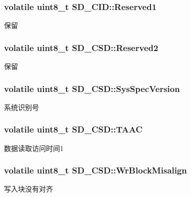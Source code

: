 \subsubsection[{\texorpdfstring{Reserved1}{Reserved1}}]{\setlength{\rightskip}{0pt plus 5cm}volatile uint8\+\_\+t S\+D\+\_\+\+C\+I\+D\+::\+Reserved1}\hypertarget{group__sd__card_ga1d5599017d56204e4fe5b0aa7dd32294}{}\label{group__sd__card_ga1d5599017d56204e4fe5b0aa7dd32294}
保留 
\subsubsection[{\texorpdfstring{Reserved2}{Reserved2}}]{\setlength{\rightskip}{0pt plus 5cm}volatile uint8\+\_\+t S\+D\+\_\+\+C\+S\+D\+::\+Reserved2}\hypertarget{group__sd__card_gae550128917d915a10d07cc6bab428d4a}{}\label{group__sd__card_gae550128917d915a10d07cc6bab428d4a}
保留 
\subsubsection[{\texorpdfstring{Sys\+Spec\+Version}{SysSpecVersion}}]{\setlength{\rightskip}{0pt plus 5cm}volatile uint8\+\_\+t S\+D\+\_\+\+C\+S\+D\+::\+Sys\+Spec\+Version}\hypertarget{group__sd__card_gae42076ec74babfee72c7a3705d13461a}{}\label{group__sd__card_gae42076ec74babfee72c7a3705d13461a}
系统识别号 
\subsubsection[{\texorpdfstring{T\+A\+AC}{TAAC}}]{\setlength{\rightskip}{0pt plus 5cm}volatile uint8\+\_\+t S\+D\+\_\+\+C\+S\+D\+::\+T\+A\+AC}\hypertarget{group__sd__card_gac3a3b789a57530a170119a3459571632}{}\label{group__sd__card_gac3a3b789a57530a170119a3459571632}
数据读取访问时间1 
\subsubsection[{\texorpdfstring{Wr\+Block\+Misalign}{WrBlockMisalign}}]{\setlength{\rightskip}{0pt plus 5cm}volatile uint8\+\_\+t S\+D\+\_\+\+C\+S\+D\+::\+Wr\+Block\+Misalign}\hypertarget{group__sd__card_gac92bbdc65323bdaa2738ba34fb801694}{}\label{group__sd__card_gac92bbdc65323bdaa2738ba34fb801694}
写入块没有对齐 